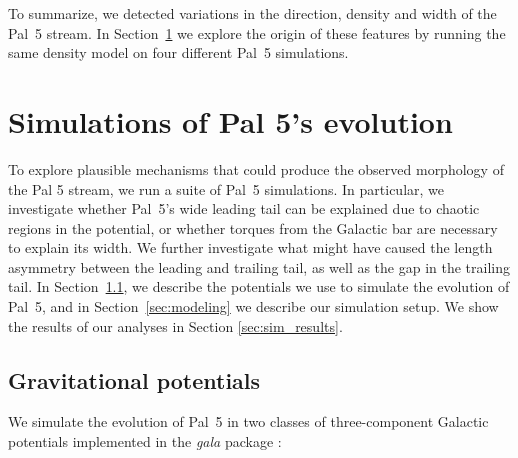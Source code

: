 \documentclass[twocolumn]{aastex62}
\newcommand{\package}[1]{\textsl{#1}}
\newcommand{\sa}[1]{{\color{magenta} SP: #1}}
\begin{document}
To summarize, we detected variations in the direction, density and width of the Pal~5 stream.
In Section~\ref{sec:sim} we explore the origin of these features by running the same density model on four different Pal~5 simulations.


\section{Simulations of Pal 5's evolution}
\label{sec:sim}
To explore plausible mechanisms that could produce the observed morphology of the Pal 5 stream, we run a suite of Pal~5 simulations.
In particular, we investigate whether Pal~5's wide leading tail can be explained due to chaotic regions in the potential, or whether torques from the Galactic bar are necessary to explain its width. We further investigate what might have caused the length asymmetry between the leading and trailing tail, as well as the gap in the trailing tail.
In Section~\ref{sec:potential}, we describe the potentials we use to simulate the evolution of Pal~5, and in Section~\ref{sec:modeling} we describe our simulation setup.
We show the results of our analyses in Section \ref{sec:sim_results}.

\subsection{Gravitational potentials}
\label{sec:potential}
We simulate the evolution of Pal~5 in two classes of three-component Galactic potentials implemented in the  \package{gala} package \citep{gala}:
\end{document}
